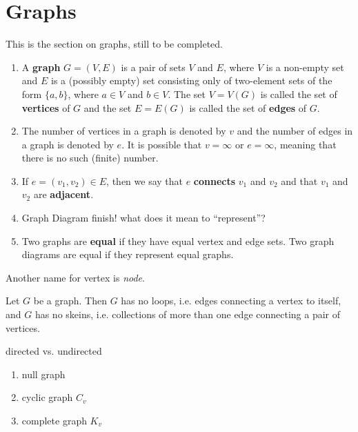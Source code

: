 \section{Graphs}\label{sec:graphs}

This is the section on graphs, still to be completed.

\begin{definition}
\begin{enumerate}
    \item \label{def:graph} A \textbf{graph} $G=(V, E)$ is a pair of sets $V$ and $E$, where $V$ is a non-empty set and $E$ is a (possibly empty) set consisting only of two-element sets of the form $\{a, b\}$, where $a \in V$ and $b \in V$.  The set $V=V(G)$ is called the set of \textbf{vertices} of $G$ and the set $E=E(G)$ is called the set of \textbf{edges} of $G$.
    \item The number of vertices in a graph is denoted by $v$ and the number of edges in a graph is denoted by $e$.  It is possible that $v=\infty$ or $e=\infty$, meaning that there is no such (finite) number.
    \item If $e=(v_1, v_2)\in E$, then we say that $e$ \textbf{connects} $v_1$ and $v_2$ and that $v_1$ and $v_2$ are \textbf{adjacent}.
    \item Graph Diagram {\color{red} finish! what does it mean to ``represent''?}
    \item Two graphs are \textbf{equal} if they have equal vertex and edge sets.  Two graph diagrams are equal if they represent equal graphs.
\end{enumerate}
\end{definition}

Another name for vertex is \textit{node}.

\begin{lemma} Let $G$ be a graph.  Then $G$ has no \textnormal{loops, i.e.} edges connecting a vertex to itself, and $G$ has no \textnormal{skeins, i.e.} collections of more than one edge connecting a pair of vertices.
\end{lemma}

{\color{red} directed vs. undirected}

\begin{examples}
    \begin{enumerate}
        \item null graph
        \item cyclic graph $C_v$
        \item complete graph $K_v$
    \end{enumerate}
\end{examples}

